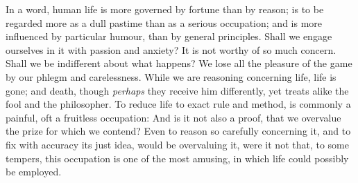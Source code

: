 In a word, human life is more governed by fortune than by reason; is
to be regarded more as a dull pastime than as a serious occupation;
and is more influenced by particular humour, than by general
principles. Shall we engage ourselves in it with passion and anxiety?
It is not worthy of so much concern. Shall we be indifferent about
what happens? We lose all the pleasure of the game by our phlegm and
carelessness. While we are reasoning concerning life, life is gone;
and death, though \textit{perhaps} they receive him differently, yet
treats alike the fool and the philosopher. To reduce life to exact
rule and method, is commonly a painful, oft a fruitless occupation:
And is it not also a proof, that we overvalue the prize for which we
contend? Even to reason so carefully concerning it, and to fix with
accuracy its just idea, would be overvaluing it, were it not that, to
some tempers, this occupation is one of the most amusing, in which
life could possibly be employed.

